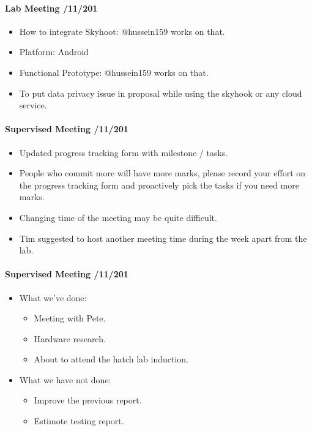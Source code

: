 \documentclass[12pt,a4paper]{article}
\begin{document}
\begin{appendices}
      \paragraph{Lab Meeting /11/201}
      \begin{itemize}
      \item How to integrate Skyhoot:  @hussein159 works on that.
      \item Platform: Android
      \item Functional Prototype: @hussein159 works on that.
      \item To put data privacy issue in proposal while using the skyhook or any cloud service.
      \end{itemize}
      
      \paragraph{Supervised Meeting /11/201}
      \begin{itemize}
      \item Updated progress tracking form with milestone / tasks.
      \item People who commit more will have more marks, please record your effort on the progress tracking form and proactively pick the tasks if you need more marks.
      \item Changing time of the meeting may be quite difficult.
      \item Tim suggested to host another meeting time during the week apart from the lab.
      \end{itemize}
      
      \paragraph{Supervised Meeting /11/201}
      \begin{itemize}
      \item What we've done:
        \begin{itemize}
          \item Meeting with Pete.
          \item Hardware research.
          \item About to attend the hatch lab induction.
        \end{itemize}
      
      \item What we have not done:
        \begin{itemize}
          \item Improve the previous report.
          \item Estimote testing report.
        \end{itemize}
      \end{itemize}
      

\end{appendices}
\end{document}
